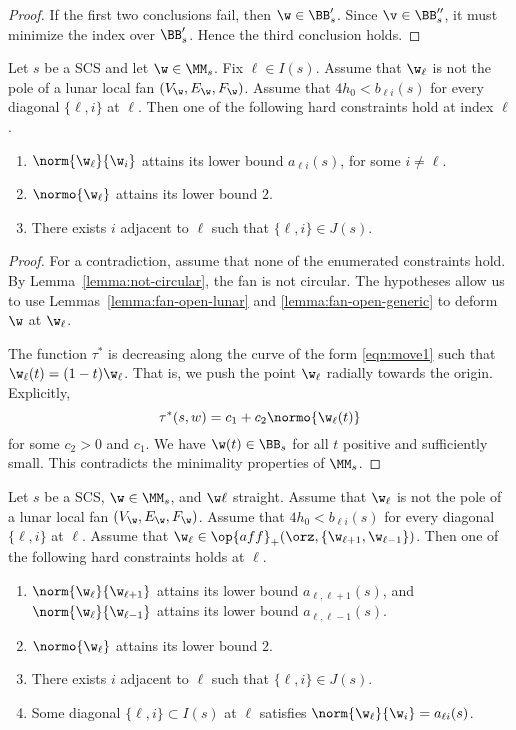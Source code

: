 \begin{proof}
If the first two conclusions fail, then $\w\in \BB'_s$.  Since $\v\in\BB''_s$,
it must minimize the index over $\BB'_s$.  Hence the third conclusion holds.
\end{proof}


\begin{lemma}\label{lemma:odx2} 
Let $s$ be a SCS and let $\w\in \MM_s$.  Fix $\ell\in I(s)$.
Assume  that $\w_\ell$ is not the pole of a lunar local fan $(V_\w,E_\w,F_\w)$.
Assume that $4h_0 < b_{\ell i}(s)$ for every diagonal $\{\ell,i\}$ at $\ell$.
Then one of the following hard  constraints hold at index $\ell$.
\begin{enumerate}
\item $\norm{\w_\ell}{\w_i}$ attains its lower bound $a_{\ell i}(s)$, for
  some $i\ne \ell$.
\item $\normo{\w_\ell}$ attains its lower bound $2$.
\item There exists $i$ adjacent to $\ell$ such that $\{\ell,i\}\in J(s)$.
\end{enumerate}
\end{lemma}

\begin{proof} 
For a contradiction, assume that none of the enumerated constraints hold.
By Lemma~\ref{lemma:not-circular}, the fan is not circular.
The hypotheses
allow us to use Lemmas~\ref{lemma:fan-open-lunar} and
\ref{lemma:fan-open-generic} to deform $\w$ at $\w_\ell$.

The function $\tau^*$ is decreasing along
the curve of the form \eqref{eqn:move1} such that
$\w_\ell(t)=(1-t) \w_\ell$.
That is, we push the point $\w_\ell$ radially towards the origin.
Explicitly, 
\[
\tau^*(s,w) = c_1 + c_2 \normo{\w_\ell(t)}
\]
for some $c_2>0$ and $c_1$.
We have
$\w(t)\in \BB_s$ for all $t$ positive and sufficiently
small.  This contradicts the minimality properties of $\MM_s$.
\end{proof}

\begin{lemma}\label{lemma:imj2}
Let $s$ be a SCS, $\w\in \MM_s$, and $\w\ell$ straight.
Assume  that $\w_\ell$ is not the pole of a lunar local fan $(V_\w,E_\w,F_\w)$.
Assume that $4h_0 < b_{\ell i}(s)$ for every diagonal $\{\ell,i\}$ at $\ell$.
Assume that $\w_\ell\in \op{aff}_+(\orz,\{\w_{\ell+1},\w_{\ell-1}\})$.
Then one of the following hard constraints holds at $\ell$.
\begin{enumerate}
\item $\norm{\w_\ell}{\w_{\ell+1}}$ attains its lower bound $a_{\ell,\ell+1}(s)$, and
 $\norm{\w_\ell}{\w_{\ell-1}}$ attains its lower bound $a_{\ell,\ell-1}(s)$.
\item $\normo{\w_\ell}$ attains its lower bound $2$.
\item There exists $i$ adjacent to $\ell$ such that $\{\ell,i\}\in J(s)$.
\item Some diagonal $\{\ell,i\}\subset I(s)$ at $\ell$ satisfies
$\norm{\w_\ell}{\w_i}=a_{\ell i}(s)$.
\end{enumerate}
\end{lemma}

